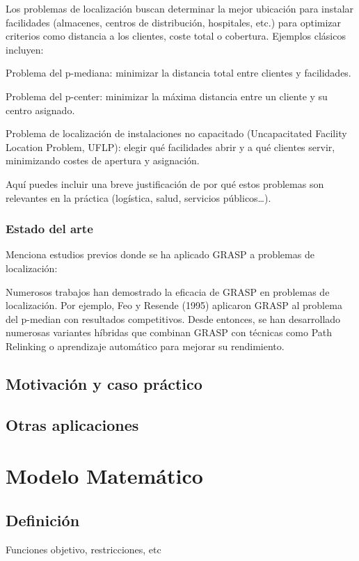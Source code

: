 \documentclass[12pt,a4paper]{book}
\begin{document}
Los problemas de localización buscan determinar la mejor ubicación para instalar facilidades (almacenes, centros de distribución, hospitales, etc.) para optimizar criterios como distancia a los clientes, coste total o cobertura. Ejemplos clásicos incluyen:

Problema del p-mediana: minimizar la distancia total entre clientes y facilidades.

Problema del p-center: minimizar la máxima distancia entre un cliente y su centro asignado.

Problema de localización de instalaciones no capacitado (Uncapacitated Facility Location Problem, UFLP): elegir qué facilidades abrir y a qué clientes servir, minimizando costes de apertura y asignación.

Aquí puedes incluir una breve justificación de por qué estos problemas son relevantes en la práctica (logística, salud, servicios públicos…).

\subsection{Estado del arte}

Menciona estudios previos donde se ha aplicado GRASP a problemas de localización:

Numerosos trabajos han demostrado la eficacia de GRASP en problemas de localización. 
Por ejemplo, Feo y Resende (1995) aplicaron GRASP al problema del p-median con resultados competitivos. 
Desde entonces, se han desarrollado numerosas variantes híbridas que combinan GRASP con técnicas como Path Relinking o aprendizaje automático para mejorar su rendimiento.


\section{Motivación y caso práctico}

\section{Otras aplicaciones}


\chapter{Modelo Matemático}

\section{Definición}
Funciones objetivo, restricciones, etc
\end{document}
